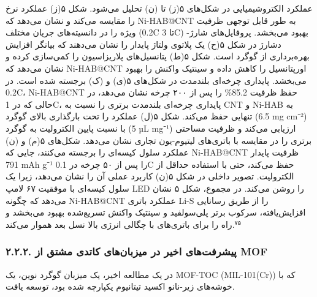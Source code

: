 \documentclass[12pt,a4paper,twocolumn]{article} %
\newcommand{\persian}[1]{\textfarsi{#1}}
\newcommand{\english}[1]{\textenglish{#1}}
\begin{document}
\persian{
عملکرد الکتروشیمیایی در شکل‌های ۵(ز) تا (ن) تحلیل می‌شود. شکل ۵(ز) عملکرد نرخ را مقایسه می‌کند و نشان می‌دهد که \english{Ni-HAB@CNT} به طور قابل توجهی ظرفیت ویژه را در دانسیته‌های جریان مختلف (\english{0.2C} تا \english{3C}) بهبود می‌بخشد. پروفایل‌های شارژ-دشارژ در شکل ۵(ح) یک پلاتوی ولتاژ پایدار را نشان می‌دهند که بیانگر افزایش بهره‌برداری از گوگرد است. شکل ۵(ط) پتانسیل‌های پلاریزاسیون را کمی‌سازی کرده و نشان می‌دهد که \english{Ni-HAB@CNT} اورپتانسیل را کاهش داده و سینتیک واکنش را بهبود می‌بخشد.
}
\persian{
پایداری چرخه‌ای بلندمدت در شکل‌های ۵(ی) و (ک) برجسته شده است. در \english{0.2C}، \english{Ni-HAB@CNT} حفظ ظرفیت \english{85.2\%} را پس از ۲۰۰ چرخه نشان می‌دهد، در حالی که در \english{1C}، پایداری چرخه‌ای بلندمدت برتری را نسبت به \english{CNT} و \english{Ni-HAB} به تنهایی حفظ می‌کند. شکل ۵(ل) عملکرد را تحت بارگذاری بالای گوگرد (\english{6.5 mg cm⁻²}) با نسبت پایین الکترولیت به گوگرد (\english{5 µL mg⁻¹}) ارزیابی می‌کند و ظرفیت مساحتی برتری را در مقایسه با باتری‌های لیتیوم-یون تجاری نشان می‌دهد. شکل‌های ۵(م) و (ن) عملکرد سلول کیسه‌ای را برجسته می‌کنند، جایی که \english{Ni-HAB@CNT} ظرفیت پایدار \english{791 mAh g⁻¹} را پس از ۵۰ چرخه در \english{0.1C} حفظ می‌کند، حتی با استفاده حداقل از الکترولیت. تصویر داخلی در شکل ۵(ن) کاربرد عملی آن را نشان می‌دهد، زیرا یک سلول کیسه‌ای با موفقیت ۶۷ لامپ \english{LED} را روشن می‌کند. در مجموع، شکل ۵ نشان می‌دهد که چگونه \english{Ni-HAB@CNT} عملکرد باتری \english{Li-S} را از طریق رسانایی افزایش‌یافته، سرکوب برتر پلی‌سولفید و سینتیک واکنش تسریع‌شده بهبود می‌بخشد و راه را برای باتری‌های با چگالی انرژی بالا نسل بعد هموار می‌کند.$^{۷۵}$
}
\subsubsection*{\persian{۲.۲.۲. پیشرفت‌های اخیر در میزبان‌های کاتدی مشتق از \english{MOF}}}
\persian{
در یک مطالعه اخیر، یک میزبان گوگرد نوین، یک \english{MOF-TOC} (\english{MIL-101(Cr)}) که با خوشه‌های زیر-نانو اکسید تیتانیوم یکپارچه شده بود، توسعه یافت.
}

\end{document}
